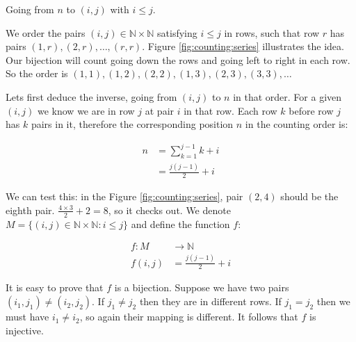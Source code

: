 \begin{solution}
\begin{marginfigure}[1.0in]
\caption{Going from $n$ to $(i, j)$ with $i \leq j$.}
\label{fig:counting:series}
\end{marginfigure}

We order the pairs $(i, j) \in \mathbb{N} \times \mathbb{N}$ satisfying $i \leq j$ in rows, such that row $r$ has pairs $(1, r), (2, r), \ldots, (r, r)$. Figure \ref{fig:counting:series} illustrates the idea. Our bijection will count going down the rows and going left to right in each row. So the order is $(1, 1), (1, 2), (2, 2), (1, 3), (2, 3), (3, 3), \ldots$

Lets first deduce the inverse, going from $(i, j)$ to $n$ in that order. For a given $(i, j)$ we know we are in row $j$ at pair $i$ in that row. Each row $k$ before row $j$ has $k$ pairs in it, therefore the corresponding position $n$ in the counting order is: 

\begin{align*}
n &= \sum_{k = 1}^{j - 1} k + i \\
  &=  \frac{j (j - 1)}{2} + i
\end{align*}

We can test this: in the Figure \ref{fig:counting:series}, pair $(2, 4)$ should be the eighth pair. $\frac{4 \times 3}{2} + 2 = 8$, so it checks out. We denote $M = \{ (i, j) \in \mathbb{N} \times \mathbb{N}:i \leq j\}$ and define the function $f$:

\begin{align*}
f: M &\to \mathbb{N} \\
f(i, j) &= \frac{j (j - 1)}{2} + i
\end{align*}

It is easy to prove that $f$ is a bijection. Suppose we have two pairs $(i_1, j_1) \ne (i_2, j_2)$. If $j_1 \ne j_2$ then they are in different rows. If $j_1 = j_2$ then we must have $i_1 \ne i_2$, so again their mapping is different. It follows that $f$ is injective.


\end{solution}
